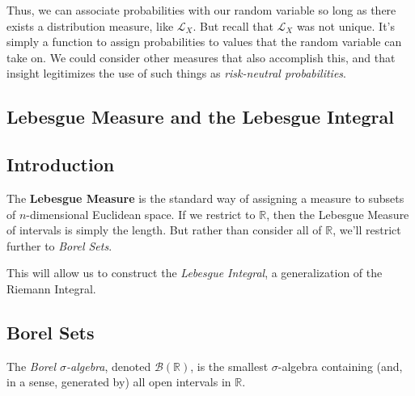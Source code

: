 \documentclass[12pt]{article}
\theoremstyle{plain}
\theoremstyle{definition}
\theoremstyle{remark}
\begin{document}
Thus, we can associate probabilities with our random variable so long as there exists a distribution measure, like $\mathcal{L}_X$.
But recall that $\mathcal{L}_X$ was not unique.  It's simply a function to assign probabilities to values that the random variable can
take on.  We could consider other measures that also accomplish this, and that insight legitimizes the use of such things as
\emph{risk-neutral probabilities}.

\subsection{Lebesgue Measure and the Lebesgue Integral}

\subsection{Introduction}

The \textbf{Lebesgue Measure} is the standard way of assigning a measure to subsets of $n$-dimensional Euclidean space.  If we restrict
to $\mathbb{R}$, then the Lebesgue Measure of intervals is simply the length. But rather than consider all of $\mathbb{R}$, we'll
restrict further to \emph{Borel Sets}.

This will allow us to construct the \emph{Lebesgue Integral}, a generalization of the Riemann Integral.

\subsection{Borel Sets}

The \emph{Borel $\sigma$-algebra}, denoted $\mathcal{B}(\mathbb{R})$, is the smallest $\sigma$-algebra containing (and, in a sense,
generated by) all open intervals
in $\mathbb{R}$.
\end{document}
